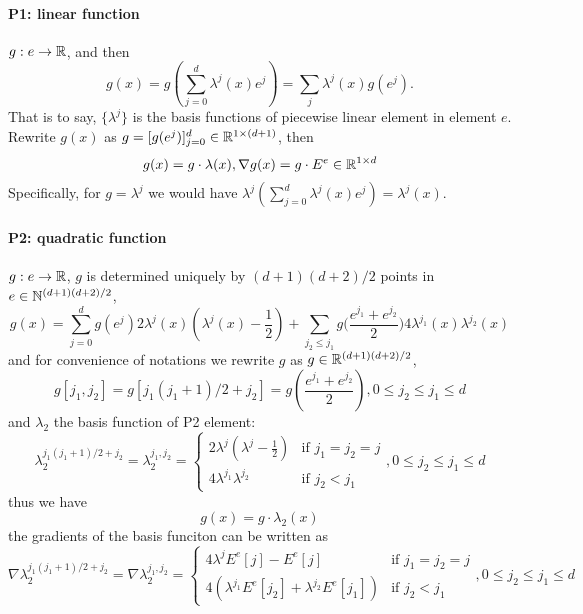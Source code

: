 \paragraph{P1: linear function} $g:e\to\mathbb{R}$, and then
\[g(x)=g({\textstyle\sum_{j=0}^{d}}\lambda^j(x)e^j)=\sum_{j}\lambda^j(x)g(e^j).\]
That is to say, $\{\lambda^j\}$ is the basis functions of piecewise linear element in element $e$. 
Rewrite $g(x)$ as $g=[g(e^j)]_{j=0}^d\in\mathbb{R}^{1\times(d+1)}$, then 
\[g(x)=g\cdot\lambda(x),\nabla g(x)=g\cdot E^e\in\mathbb{R}^{1\times d}\]
Specifically, for $g=\lambda^j$ we would have $\lambda^j(\sum_{j=0}^{d}\lambda^j(x)e^j)=\lambda^j(x)$.

\paragraph{P2: quadratic function} $g:e\to\mathbb{R}$, 
$g$ is determined uniquely by $(d+1)(d+2)/2$ points in 
$e\in\mathbb{N}^{(d+1)(d+2)/2}$, 
\[g(x)=\sum_{j=0}^dg(e^j)2\lambda^j(x)(\lambda^j(x)-\frac12)+
\sum_{j_2\leq j_1}g\big(\frac{e^{j_1}+e^{j_2}}2\big)4\lambda^{j_1}(x)\lambda^{j_2}(x)\]
and for convenience of notations we rewrite $g$ as $g\in\mathbb{R}^{(d+1)(d+2)/2}$, 
\begin{equation}\label{eq:quadratic-freedom}
  g[j_1,j_2]=g[j_1(j_1+1)/2+j_2]=g(\frac{e^{j_1}+e^{j_2}}2), 0\leq j_2\leq j_1\leq d
\end{equation}
and $\lambda_2$ the basis function of P2 element:
\[
  \lambda_2^{j_1(j_1+1)/2+j_2}=\lambda_2^{j_1,j_2}=\left\{
  \begin{array}{ll}
    2\lambda^j(\lambda^j-\frac12) & \text{if } j_1=j_2=j \\
    4\lambda^{j_1}\lambda^{j_2}   & \text{if } j_2<j_1
  \end{array}
  \right., 0\leq j_2\leq j_1\leq d
\]
thus we have
\[g(x)=g\cdot\lambda_2(x)\]
the gradients of the basis funciton can be written as
\[
  \nabla\lambda_2^{j_1(j_1+1)/2+j_2}=\nabla\lambda_2^{j_1,j_2}=\left\{
  \begin{array}{ll}
    4\lambda^jE^e[j]-E^e[j]                        & \text{if } j_1=j_2=j \\
    4(\lambda^{j_1}E^e[j_2]+\lambda^{j_2}E^e[j_1]) & \text{if } j_2<j_1
  \end{array}
  \right., 0\leq j_2\leq j_1\leq d
\]
